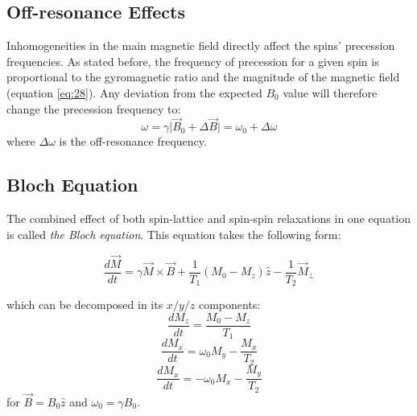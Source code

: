 \hfill

\subsection{Off-resonance Effects}

Inhomogeneities in the main magnetic field directly affect the spins' precession frequencies.
As stated before, the frequency of precession for a given spin is proportional to the gyromagnetic ratio and the magnitude of the magnetic field (equation \ref{eq:28}).
Any deviation from the expected $B_0$ value will therefore change the precession frequency to:
\begin{equation}
    \omega = \gamma \lvert \vec{B}_0 + \Delta \vec{B} \rvert = \omega_0 + \Delta \omega
\end{equation}
where $\Delta \omega$ is the off-resonance frequency.

\hfill

\subsection{Bloch Equation}
\label{chapterlabel2sec1Bloch}

The combined effect of both spin-lattice and spin-spin relaxations in one equation is called \textit{the Bloch equation}. 
This equation takes the following form:

\begin{equation} \label{eq:421}
    \frac{d\vec{M}}{dt} = \gamma \vec{M} \times \vec{B} + \frac{1}{T_1} (M_0 - M_z) \hat{z} - \frac{1}{T_2} \vec{M}_{\perp}
\end{equation} 

which can be decomposed in its $x/y/z$ components:
\begin{equation} \label{eq:422}
    \frac{dM_z}{dt} = \frac{M_0 - M_z}{T_1}
\end{equation}
\begin{equation} \label{eq:423}
    \frac{dM_x}{dt} = \omega_0 M_y - \frac{M_x}{T_2}
\end{equation}
\begin{equation} \label{eq:424}
    \frac{dM_x}{dt} = -\omega_0 M_x - \frac{M_y}{T_2}
\end{equation}
for $\vec{B} = B_0 \hat{z}$ and $\omega_0 = \gamma B_0$.

\hfill

